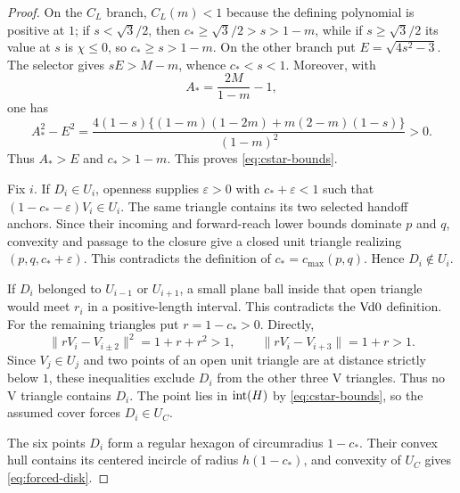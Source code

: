 \begin{proof}
On the $C_L$ branch, $C_L(m)<1$ because the defining polynomial is positive
at $1$; if $s<\sqrt3/2$, then $c_*\ge\sqrt3/2>s>1-m$, while if
$s\ge\sqrt3/2$ its value at $s$ is $\chi\le0$, so $c_*\ge s>1-m$.
On the other branch put $E=\sqrt{4s^2-3}$.  The selector gives
$sE>M-m$, whence $c_*<s<1$.  Moreover, with
\[
 A_*=\frac{2M}{1-m}-1,
\]
one has
\[
 A_*^2-E^2=
 \frac{4(1-s)\{(1-m)(1-2m)+m(2-m)(1-s)\}}{(1-m)^2}>0.
\]
Thus $A_*>E$ and $c_*>1-m$.  This proves
\eqref{eq:cstar-bounds}.

Fix $i$.  If $D_i\in U_i$, openness supplies $\varepsilon>0$ with
$c_*+\varepsilon<1$ such that
$(1-c_*-\varepsilon)V_i\in U_i$.  The same triangle contains its two selected
handoff anchors.  Since their incoming and forward-reach lower bounds dominate $p$ and
$q$, convexity and passage to the closure give a closed unit triangle
realizing $(p,q,c_*+\varepsilon)$.  This contradicts the definition of
$c_*=c_{\max}(p,q)$.  Hence $D_i\notin U_i$.

If $D_i$ belonged to $U_{i-1}$ or $U_{i+1}$, a small plane ball inside that
open triangle would meet $r_i$ in a positive-length
interval.  This contradicts the $\mathrm{Vd0}$ definition.  For the remaining
triangles put $r=1-c_*>0$.  Directly,
\[
 \lVert rV_i-V_{i\pm2}\rVert^2=1+r+r^2>1,
 \qquad
 \lVert rV_i-V_{i+3}\rVert=1+r>1.
\]
Since $V_j\in U_j$ and two points of an open unit triangle are at distance
strictly below $1$, these inequalities exclude $D_i$ from the other three
V triangles.  Thus no V triangle contains $D_i$.  The point lies in
$\mathrm{int}(H)$ by \eqref{eq:cstar-bounds}, so the assumed cover forces
$D_i\in U_C$.

The six points $D_i$ form a regular hexagon of circumradius $1-c_*$.  Their
convex hull contains its centered incircle of radius $h(1-c_*)$, and convexity
of $U_C$ gives \eqref{eq:forced-disk}.
\end{proof}

